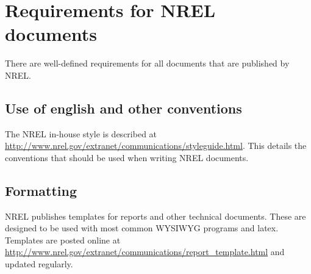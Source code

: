 \chapter{Requirements for NREL documents}

There are well-defined requirements for all documents that are published by NREL. 

\section{Use of english and other conventions}
The NREL in-house style is described at \href{http://www.nrel.gov/extranet/communications/styleguide.html}{http://www.nrel.gov/extranet/communications/styleguide.html}. This details the conventions that should be used when writing NREL documents.

\section{Formatting}
NREL publishes templates for reports and other technical documents. These are designed to be used with most common WYSIWYG programs and latex. Templates are posted online at \href{http://www.nrel.gov/extranet/communications/report\_template.html}{http://www.nrel.gov/extranet/communications/report\_template.html} and updated regularly. 